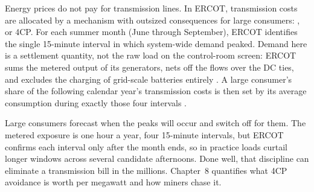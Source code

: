 Energy prices do not pay for transmission lines. In ERCOT, transmission costs are allocated by a mechanism with outsized consequences for large consumers: , or 4CP. For each summer month (June through September), ERCOT identifies the single 15-minute interval in which system-wide demand peaked. Demand here is a settlement quantity, not the raw load on the control-room screen: ERCOT sums the metered output of its generators, nets off the flows over the DC ties, and excludes the charging of grid-scale batteries entirely \autocite{ercot2026protocols}. %
A large consumer's share of the following calendar year's transmission costs is then set by its average consumption during exactly those four intervals \autocite{puct25192}. %

Large consumers forecast when the peaks will occur and switch off for them. The metered exposure is one hour a year, four 15-minute intervals, but ERCOT confirms each interval only after the month ends, so in practice loads curtail longer windows across several candidate afternoons. Done well, that discipline can eliminate a transmission bill in the millions. Chapter~8 quantifies what 4CP avoidance is worth per megawatt and how miners chase it.

